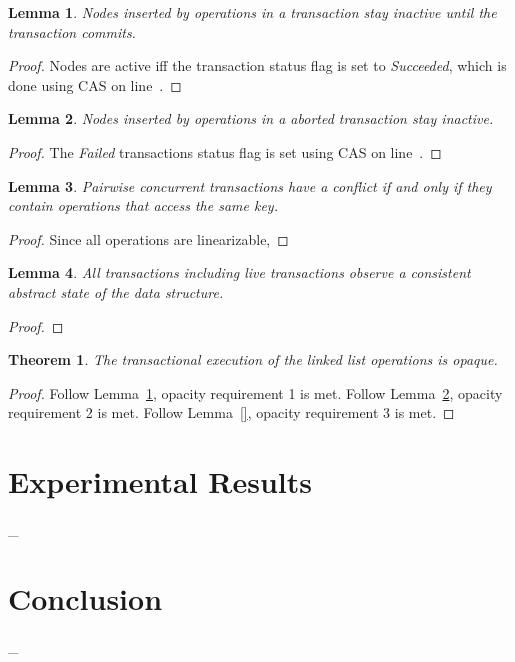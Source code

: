 \documentclass[10pt,conference,compsocconf]{IEEEtran}
\newtheorem{theorem}{Theorem}
\newtheorem{lemma}{Lemma}
\begin{document}
\begin{lemma} \label{lmm:inactive}
    Nodes inserted by operations in a transaction stay inactive until the transaction commits.
\end{lemma}
\begin{proof}
    Nodes are active iff the transaction status flag is set to \emph{Succeeded}, which is done using CAS on line~.
\end{proof}

\begin{lemma} \label{lmm:inactive1}
    Nodes inserted by operations in a aborted transaction stay inactive.
\end{lemma}
\begin{proof}
    The \emph{Failed} transactions status flag is set using CAS on line~.
\end{proof}

\begin{lemma}
    Pairwise concurrent transactions have a conflict if and only if they contain operations that access the same key.
\end{lemma}
\begin{proof}
    Since all operations are linearizable, 
\end{proof}

\begin{lemma}
    All transactions including live transactions observe a consistent abstract state of the data structure.
\end{lemma}
\begin{proof}
\end{proof}

\begin{theorem}
    The transactional execution of the linked list operations is opaque.
\end{theorem}
\begin{proof}
Follow Lemma~\ref{lmm:inactive}, opacity requirement 1 is met. 
Follow Lemma~\ref{lmm:inactive1}, opacity requirement 2 is met. 
Follow Lemma~\ref{}, opacity requirement 3 is met. 
\end{proof}

\section{Experimental Results}
\label{sec:experiment}
\_

\section{Conclusion}
\label{sec:conclusion}
\_




\end{document}
